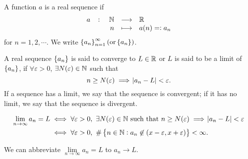 \documentclass[11pt,openany]{article}
\begin{document}
\newpage
\vfill
{}
\begin{remark*}
A function $a$ is a real sequence if \[
\fullfunction{a}{\N}{\R}{n}{a(n)=:a_n}
\] for $n=1,2,\cdots$. We write $
\set{a_n}_{n=1}^{\infty} (\text{or} \set{a_n})$.
\end{remark*}
\begin{tcolorbox}[colback=white]
	\begin{definition}[\bf Convergence]
		A real sequence $\set{a_n}$ is said to converge to $L\in\mathbb{R} $ or $L$ is said to be a limit of $\set{a_n}$,
		if $\forall\varepsilon>0$, $\exists N(\varepsilon)\in\mathbb{N}$ such that \[
		n\geq N(\varepsilon)\implies \abs{a_n-L}<\varepsilon.
		\]
		If a sequence has a limit, we say that the sequence is convergent; if it has no limit, we say that the
		sequence is divergent.
	\end{definition}
\end{tcolorbox}
\begin{remark}
	\begin{align*}
		\lim_{n\to\infty}a_n=L&\iff \forall\varepsilon>0,\ \exists N(\varepsilon)\in\N\ \text{such that}\ n\geq N(\varepsilon)\implies \abs{a_n-L}<\varepsilon\\
		&\iff\forall\varepsilon>0,\ \#\set{n\in\N: a_n\not\in(x-\varepsilon,x+\varepsilon)}<\infty.
	\end{align*}
\end{remark}
\begin{remark}
	We can abbreviate $\lim\limits_{n\to\infty}a_n=L$ to $a_n\to L$.
\end{remark}
\end{document}
